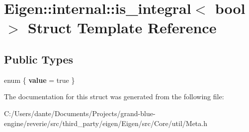 \hypertarget{struct_eigen_1_1internal_1_1is__integral_3_01bool_01_4}{}\section{Eigen\+::internal\+::is\+\_\+integral$<$ bool $>$ Struct Template Reference}
\label{struct_eigen_1_1internal_1_1is__integral_3_01bool_01_4}
\subsection*{Public Types}
\begin{DoxyCompactItemize}
\item 
\mbox{\label{struct_eigen_1_1internal_1_1is__integral_3_01bool_01_4_a621a217a4d97b9dccfb2be0d1aeede6e}} 
enum \{ {\bfseries value} = true
 \}
\end{DoxyCompactItemize}


The documentation for this struct was generated from the following file\+:\begin{DoxyCompactItemize}
\item 
C\+:/\+Users/dante/\+Documents/\+Projects/grand-\/blue-\/engine/reverie/src/third\+\_\+party/eigen/\+Eigen/src/\+Core/util/Meta.\+h\end{DoxyCompactItemize}
